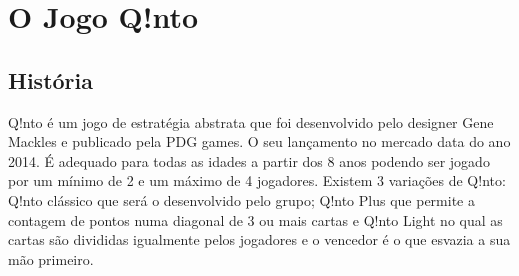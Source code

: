 \documentclass[a4paper]{article}
\begin{document}

\newpage

%
%
%
%
%
%
%


\section{O Jogo Q!nto}

\subsection{História}

Q!nto é um jogo de estratégia abstrata que foi desenvolvido pelo designer Gene Mackles e publicado pela PDG games. O seu lançamento no mercado data do ano 2014. É adequado para todas as idades a partir dos 8 anos podendo ser jogado por um mínimo de 2 e um máximo de 4 jogadores. Existem 3 variações de Q!nto: Q!nto clássico que será o desenvolvido pelo grupo; Q!nto Plus que permite a contagem de pontos numa diagonal de 3 ou mais cartas e Q!nto Light no qual as cartas são divididas igualmente pelos jogadores e o vencedor é o que esvazia a sua mão primeiro. 
\end{document}
